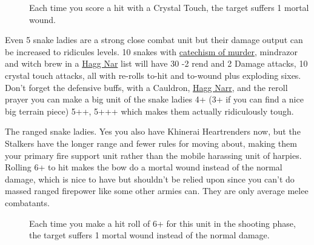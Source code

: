 \begin{description}
    \item  [] Each time you
        score a hit with a Crystal Touch, the target suffers 1 mortal wound.
\end{description}

Even 5 snake ladies are a strong close combat unit
but their damage output can be increased to ridicules levels. 10 snakes with
\hyperref[catechism-of-murder]{catechism of murder}, mindrazor and witch brew
in a \hyperref[hagg-nar]{Hagg Nar} list will have 30 -2 rend and 2 Damage
attacks, 10 crystal touch attacks, all with re-rolls to-hit and to-wound plus
exploding sixes.\\
Don't forget the defensive buffs, with a Cauldron, \hyperref[hagg-nar]{Hagg
Narr}, and the reroll prayer you can make a big unit of the snake ladies 4+ (3+
if you can find a nice big terrain piece) 5++, 5+++ which makes them actually
ridiculously tough.  


\newpage %

The ranged snake ladies. Yes you also have Khinerai Heartrenders now, but the
Stalkers have the longer range and fewer rules for moving about, making them
your primary fire support unit rather than the mobile harassing unit of
harpies. Rolling 6+ to hit makes the bow do a mortal wound instead of the
normal damage, which is nice to have but shouldn't be relied upon since you
can't do massed ranged firepower like some other armies can. They are only
average melee combatants.\\ 

\begin{description}
    \item [] Each time you make a hit roll
        of 6+ for this unit in the shooting phase, the target suffers 1 mortal
        wound instead of the normal damage.
\end{description}

